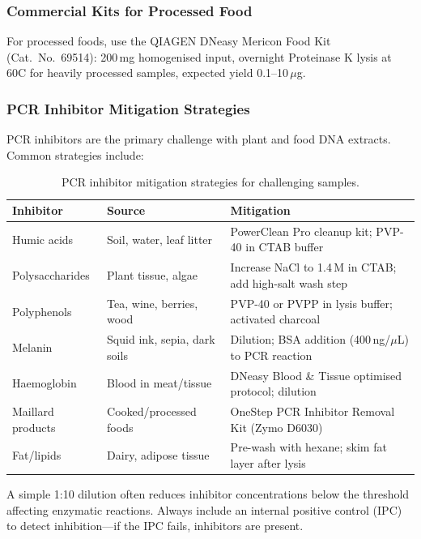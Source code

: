 \subsubsection{Commercial Kits for Processed Food}

For processed foods, use the QIAGEN DNeasy Mericon Food Kit (Cat.\ No.\ 69514): 200\,mg homogenised input, overnight Proteinase K lysis at 60\textdegree C for heavily processed samples, expected yield 0.1--10\,$\mu$g.

\subsubsection{PCR Inhibitor Mitigation Strategies}

\acrshort{PCR} inhibitors are the primary challenge with plant and food DNA extracts. Common strategies include:

\begin{table}[htbp]
\centering
\caption{PCR inhibitor mitigation strategies for challenging samples.}
\label{tab:protocols:inhibitors}
\small
\renewcommand{\arraystretch}{1.3}
\begin{tabularx}{\textwidth}{@{}l l X@{}}
\toprule
\textbf{Inhibitor} & \textbf{Source} & \textbf{Mitigation} \\
\midrule
Humic acids & Soil, water, leaf litter & PowerClean Pro cleanup kit; PVP-40 in CTAB buffer \\
\addlinespace
Polysaccharides & Plant tissue, algae & Increase NaCl to 1.4\,M in CTAB; add high-salt wash step \\
\addlinespace
Polyphenols & Tea, wine, berries, wood & PVP-40 or PVPP in lysis buffer; activated charcoal \\
\addlinespace
Melanin & Squid ink, sepia, dark soils & Dilution; BSA addition (400\,ng/$\mu$L) to PCR reaction \\
\addlinespace
Haemoglobin & Blood in meat/tissue & DNeasy Blood \& Tissue optimised protocol; dilution \\
\addlinespace
Maillard products & Cooked/processed foods & OneStep PCR Inhibitor Removal Kit (Zymo D6030) \\
\addlinespace
Fat/lipids & Dairy, adipose tissue & Pre-wash with hexane; skim fat layer after lysis \\
\bottomrule
\end{tabularx}
\end{table}

\begin{tipbox}[title={The ``Dilution Solution''}]
A simple 1:10 dilution often reduces inhibitor concentrations below the threshold affecting enzymatic reactions. Always include an internal positive control (IPC) to detect inhibition---if the IPC fails, inhibitors are present.
\end{tipbox}

